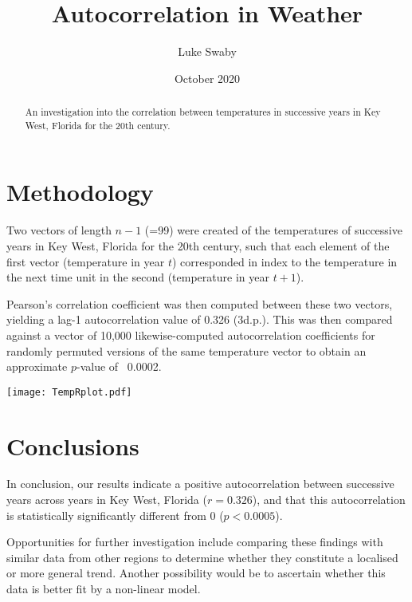 \documentclass[12pt]{article}
\title{Autocorrelation in Weather}
\author{Luke Swaby}
\date{October 2020}
\begin{document}
	\maketitle
  
	\begin{abstract}
	An investigation into the correlation between temperatures in successive years in Key West, Florida for the 20th century.
	\end{abstract}
  
	\section{Methodology}
	Two vectors of length $n-1$ (=99) were created of the temperatures of successive years in Key West, Florida for the 20th century, such that each element of the first vector (temperature in year $t$) corresponded in index to the temperature in the next time unit in the second (temperature in year $t+1$). 
	
	Pearson’s correlation coefficient was then computed between these two vectors, yielding a lag-1 autocorrelation value of 0.326 (3d.p.). This was then compared against a vector of 10,000 likewise-computed autocorrelation coefficients for randomly permuted versions of the same temperature vector to obtain an approximate $p$-value of ~0.0002.
	
	\begin{center}
	\texttt{[image: TempRplot.pdf]}
    \end{center}
    
	\section{Conclusions}
	In conclusion, our results indicate a positive autocorrelation between successive years across years in Key West, Florida ($r=0.326$), and that this autocorrelation is statistically significantly different from 0 ($p < 0.0005$).
	
	Opportunities for further investigation include comparing these findings with similar data from other regions to determine whether they constitute a localised or more general trend. Another possibility would be to ascertain whether this data is better fit by a non-linear model.
\end{document}
